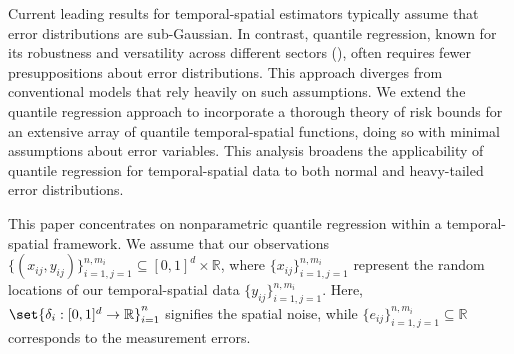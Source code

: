 \documentclass[twoside,11pt]{article}
\newcommand{\rev}[1]{{\color{revisionred}#1}}
\begin{document}
Current leading results for temporal-spatial estimators typically assume that error distributions are sub-Gaussian. In contrast, quantile regression, known for its robustness and versatility across different sectors (\cite{coad2006innovation, sanderson2006statistically, perlich2007high, benoit2009benefits, wasko2014quantile, pata2015astronomical, belloni2023high,zhang2023risk}), often requires fewer presuppositions about error distributions. This approach diverges from conventional models that rely heavily on such assumptions. We extend the quantile regression approach to incorporate a thorough theory of risk bounds for an extensive array of quantile temporal-spatial functions, doing so with minimal assumptions about error variables. \rev{This analysis broadens the applicability of quantile regression for temporal-spatial data to both normal and heavy-tailed error distributions.}




This paper concentrates on nonparametric quantile regression within a temporal-spatial framework. We assume that our observations $\{(x_{ij}, y_{ij})\}_{i=1,j=1}^{n,m_i} \subseteq [0, 1]^d \times \mathbb{R}$, where $\{x_{ij}\}_{i=1,j=1}^{n,m_i}$ represent the random locations of our temporal-spatial data $\{y_{ij}\}_{i=1,j=1}^{n,m_i}$. Here, $\set{\delta_i : [0, 1]^d \to \mathbb{R}}_{i=1}^n$ signifies the spatial noise, while $\{e_{ij}\}_{i=1,j=1}^{n,m_i} \subseteq \mathbb{R}$ corresponds to the measurement errors. 






\end{document}
